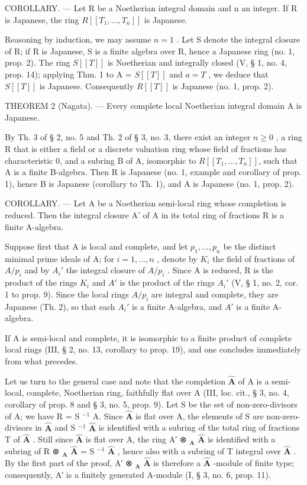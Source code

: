 COROLLARY. --- Let R be a Noetherian integral domain and n an integer. If R is Japanese, the ring \(R[[T_{1}, \ldots, T_{n}]]\) is Japanese.

Reasoning by induction, we may assume \(n = 1\) . Let S denote the integral closure of R; if R is Japanese, S is a finite algebra over R, hence a Japanese ring (no. 1, prop. 2). The ring \(S[[T]]\) is Noetherian and integrally closed (V, § 1, no. 4, prop. 14); applying Thm. 1 to A = \(S[[T]]\) and \(a = T\) , we deduce that \(S[[T]]\) is Japanese. Consequently \(R[[T]]\) is Japanese (no. 1, prop. 2).

THEOREM 2 (Nagata). --- Every complete local Noetherian integral domain A is Japanese.

By Th. 3 of § 2, no. 5 and Th. 2 of § 3, no. 3, there exist an integer \(n \geqslant 0\) , a ring R that is either a field or a discrete valuation ring whose field of fractions has characteristic 0, and a subring B of A, isomorphic to \(R[[T_{1}, \ldots, T_{n}]]\), such that A is a finite B-algebra. Then R is Japanese (no. 1, example and corollary of prop. 1), hence B is Japanese (corollary to Th. 1), and A is Japanese (no. 1, prop. 2).

COROLLARY. --- Let A be a Noetherian semi-local ring whose completion is reduced. Then the integral closure A' of A in its total ring of fractions R is a finite A-algebra.

Suppose first that A is local and complete, and let \(p_{1}, \ldots, p_{n}\) be the distinct minimal prime ideals of A; for \(i = 1, \ldots, n\) , denote by \(K_{i}\) the field of fractions of \(A/p_{i}\) and by \(A_{i}'\) the integral closure of \(A/p_{i}\) . Since A is reduced, R is the product of the rings \(K_{i}\) and \(A'\) is the product of the rings \(A_{i}'\) (V, § 1, no. 2, cor. 1 to prop. 9). Since the local rings \(A/p_{i}\) are integral and complete, they are Japanese (Th. 2), so that each \(A_{i}'\) is a finite A-algebra, and \(A'\) is a finite A-algebra.

If A is semi-local and complete, it is isomorphic to a finite product of complete local rings (III, § 2, no. 13, corollary to prop. 19), and one concludes immediately from what precedes.

Let us turn to the general case and note that the completion \(\hat{\mathbf{A}}\) of A is a semi-local, complete, Noetherian ring, faithfully flat over A (III, loc. cit., § 3, no. 4, corollary of prop. 8 and § 3, no. 5, prop. 9). Let S be the set of non-zero-divisors of A; we have R = S \(^{-1}\) A. Since \(\hat{\mathbf{A}}\) is flat over A, the elements of S are non-zero-divisors in \(\hat{\mathbf{A}}\) and S \(^{-1}\) \(\hat{\mathbf{A}}\) is identified with a subring of the total ring of fractions T of \(\hat{\mathbf{A}}\) . Still since \(\hat{\mathbf{A}}\) is flat over A, the ring A′ ⊗ \(_{\mathbf{A}}\) \(\hat{\mathbf{A}}\) is identified with a subring of R ⊗ \(_{\mathbf{A}}\) \(\hat{\mathbf{A}}\) = S \(^{-1}\) \(\hat{\mathbf{A}}\) , hence also with a subring of T integral over \(\hat{\mathbf{A}}\) . By the first part of the proof, A′ ⊗ \(_{\mathbf{A}}\) \(\hat{\mathbf{A}}\) is therefore a \(\hat{\mathbf{A}}\) -module of finite type; consequently, A′ is a finitely generated A-module (I, § 3, no. 6, prop. 11).

